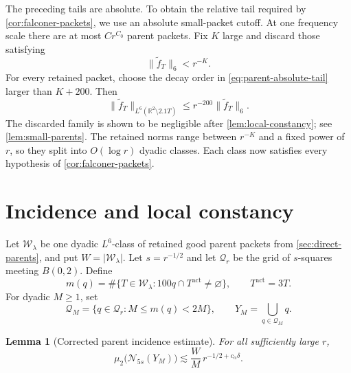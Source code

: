 \documentclass[11pt,letterpaper]{amsart}
\newtheorem{lemma}[lemma]{Lemma}
\newcommand{\R}{\mathbb{R}}
\newcommand{\cN}{\mathcal{N}}
\newcommand{\cW}{\mathcal{W}}
\newcommand{\cQ}{\mathcal{Q}}
\newcommand{\abs}[1]{\lvert#1\rvert}
\newcommand{\norm}[1]{\lVert#1\rVert}
\begin{document}
The preceding tails are absolute.  To obtain the relative tail required by
\cref{cor:falconer-packets}, we use an absolute small-packet cutoff.  At one
frequency scale there are at most \(Cr^{C_0}\) parent packets.  Fix \(K\)
large and discard those satisfying
\begin{equation}\label{eq:absolute-small}
 \norm{\widetilde f_T}_6<r^{-K}.
\end{equation}
For every retained packet, choose the decay order in
\eqref{eq:parent-absolute-tail} larger than \(K+200\).  Then
\begin{equation}\label{eq:parent-relative-tail}
 \norm{\widetilde f_T}_{L^6(\R^2\setminus2.1T)}
 \le r^{-200}\norm{\widetilde f_T}_6.
\end{equation}
The discarded family is shown to be negligible after
\cref{lem:local-constancy}; see \cref{lem:small-parents}.  The retained norms
range between \(r^{-K}\) and a fixed power of \(r\), so they split into
\(O(\log r)\) dyadic classes.  Each class now satisfies every hypothesis of
\cref{cor:falconer-packets}.

\section{Incidence and local constancy}
\label{sec:incidence-local}

Let \(\cW_\lambda\) be one dyadic \(L^6\)-class of retained good parent
packets from \cref{sec:direct-parents}, and put \(W=\abs{\cW_\lambda}\).
Let \(s=r^{-1/2}\) and let \(\cQ_r\) be the grid of \(s\)-squares meeting
\(B(0,2)\).  Define
\begin{equation}\label{eq:parent-multiplicity}
 m(q)=\#\{T\in\cW_\lambda:100q\cap T^{\mathrm{act}}\ne\varnothing\},
 \qquad T^{\mathrm{act}}=3T.
\end{equation}
For dyadic \(M\ge1\), set
\[
 \cQ_M=\{q\in\cQ_r:M\le m(q)<2M\},
 \qquad
 Y_M=\bigcup_{q\in\cQ_M}q.
\]

\begin{lemma}[Corrected parent incidence estimate]
\label{lem:incidence}
For all sufficiently large \(r\),
\begin{equation}\label{eq:incidence}
 \mu_2\bigl(\cN_{5s}(Y_M)\bigr)
 \lesssim\frac{W}{M}\,r^{-1/2+c_\alpha\delta}.
\end{equation}
\end{lemma}
\end{document}
